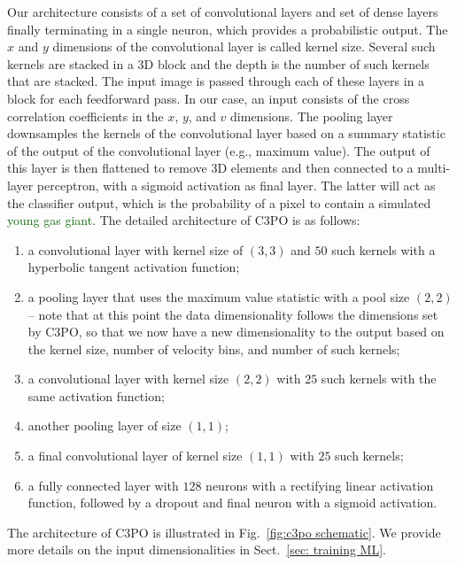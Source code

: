 \documentclass[referee]{aa} %
\newcommand{\newchange}[1]{\textcolor{darkgreen}{#1}}
\begin{document}
Our architecture consists of a set of convolutional layers and set of dense layers finally terminating in a single neuron, which provides a probabilistic output.
The $x$ and $y$ dimensions of the convolutional layer is called kernel size.
Several such kernels are stacked in a 3D block and the depth is the number of such kernels that are stacked.
The input image is passed through each of these layers in a block for each feedforward pass.
In our case, an input consists of the cross correlation coefficients in the $x$, $y$, and $v$ dimensions.
The pooling layer downsamples the kernels of the convolutional layer based on a summary statistic of the output of the convolutional layer (e.g., maximum value).
The output of this layer is then flattened to remove 3D elements and then connected to a multi-layer perceptron, with a sigmoid activation as final layer. 
The latter will act as the classifier output, which is the probability of a pixel to contain a simulated \newchange{young gas giant}. The detailed architecture of C3PO is as follows:
\begin{enumerate}
    \item a convolutional layer with kernel size of $\left(3,3\right)$ and $50$ such kernels with a hyperbolic tangent activation function;
    \item a pooling layer that uses the maximum value statistic with a pool size $(2,2)$ -- note that at this point the data dimensionality follows the dimensions set by C3PO, so that we now have a new dimensionality to the output based on the kernel size, number of velocity bins, and number of such kernels;
    \item a convolutional layer with kernel size $\left(2,2\right)$ with $25$ such kernels with the same activation function;
    \item another pooling layer of size $(1,1)$;
    \item a final convolutional layer of kernel size $(1,1)$ with $25$ such kernels;
    \item a fully connected layer with $128$ neurons with a rectifying linear activation function, followed by a dropout and final neuron with a sigmoid activation.
\end{enumerate}
The architecture of C3PO is illustrated in Fig.~\ref{fig:c3po schematic}. We provide more details on the input dimensionalities in Sect.~\ref{sec: training ML}.
\end{document}
